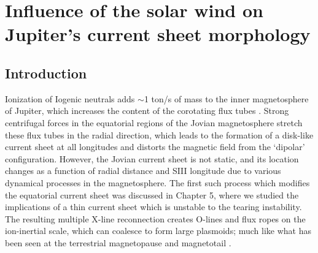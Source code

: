 \chapter{Influence of the solar wind on Jupiter's current sheet morphology}

\section{Introduction}

Ionization of Iogenic neutrals adds  $\sim$1 ton/s of mass to the inner magnetosphere of Jupiter, which increases the content of the corotating flux tubes \cite{Bagenal2011b}. Strong centrifugal forces in the equatorial regions of the Jovian magnetosphere stretch these flux tubes in the radial direction, which leads to the formation of a disk-like current sheet at all longitudes \cite{Khurana2004a} and distorts the magnetic field from the `dipolar' configuration. However, the Jovian current sheet is not static, and its location changes as a function of radial distance and SIII longitude due to various dynamical processes in the magnetosphere. The first such process which modifies the equatorial current sheet was discussed in Chapter 5, where we studied the implications of a thin current sheet which is unstable to the tearing instability. The resulting multiple X-line reconnection creates O-lines and flux ropes on the ion-inertial scale, which can coalesce to form large plasmoids; much like what has been seen at the terrestrial magnetopause and magnetotail \cite{AkhavanTafti2020ComparativeEvents, Eastwood2005ObservationsStudy}.

